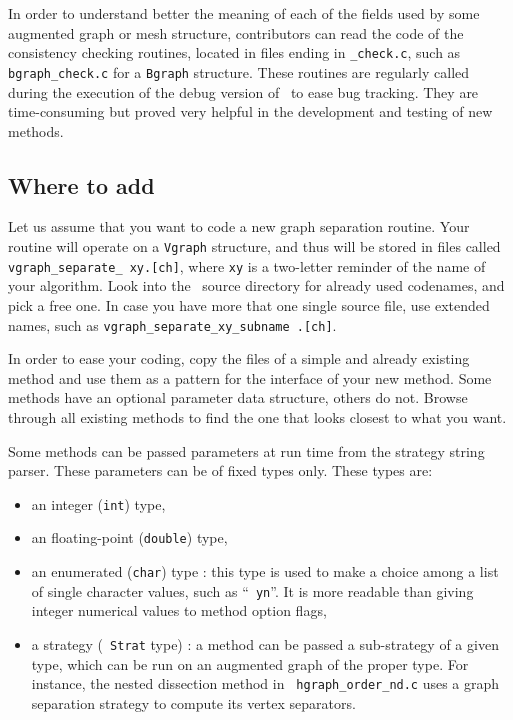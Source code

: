 In order to understand better the meaning of each of the fields
used by some augmented graph or mesh structure, contributors can read
the code of the consistency checking routines, located in files ending
in {\tt \_check.c}\enspace, such as {\tt bgraph\_check.c} for a
{\tt Bgraph} structure. These routines are regularly called during the
execution of the debug version of \scotch\ to ease bug tracking. They
are time-consuming but proved very helpful in the development and
testing of new methods.

\subsection{Where to add}

Let us assume that you want to code a new graph separation
routine. Your routine will operate on a {\tt Vgraph} structure, and
thus will be stored in files called {\tt vgraph\_\lbt separate\_
xy\lbt .[ch]}, where {\tt xy} is a two-letter reminder of the name
of your algorithm. Look into the \libscotch\ source directory for
already used codenames, and pick a free one.
In case you have more that one single source file, use extended names,
such as {\tt vgraph\_\lbt separate\_\lbt xy\_\lbt subname\lbt
.[ch]}\enspace .

In order to ease your coding, copy the files of a simple and already
existing method and use them as a pattern for the interface of your
new method. Some methods have an optional parameter data structure,
others do not. Browse through all existing methods to find the one
that looks closest to what you want.

Some methods can be passed parameters at run time from the strategy
string parser. These parameters can be of fixed types only. These
types are:
\begin{itemize}
\item
an integer ({\tt int}) type,
\item
an floating-point ({\tt double}) type,
\item
an enumerated ({\tt char}) type : this type is used to make a
choice among a list of single character values, such as ``{\tt
yn}''. It is more readable than giving integer numerical values to
method option flags,
\item
a strategy (\scotch\ {\tt Strat} type) : a method can be passed a
sub-strategy of a given type, which can be run on an augmented graph
of the proper type. For instance, the nested dissection method in {\tt
hgraph\_\lbt order\_\lbt nd\lbt .c} uses a graph separation strategy
to compute its vertex separators.
\end{itemize}

